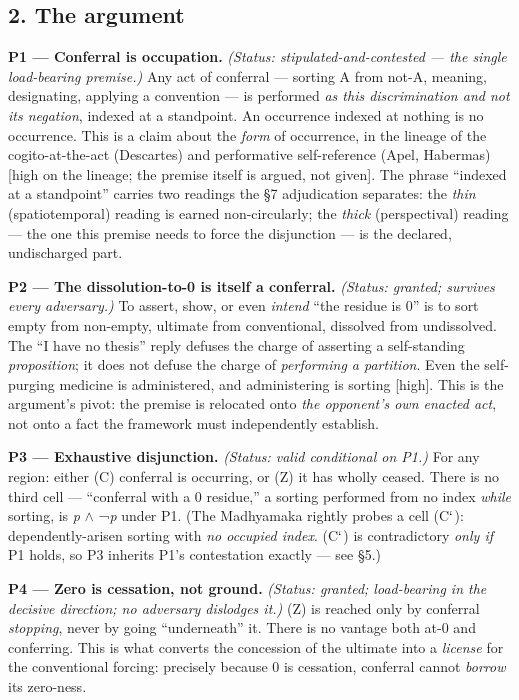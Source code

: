 \documentclass[11pt]{article}
\begin{document}
\subsection*{2. The argument}

\textbf{P1 — Conferral is occupation.} \emph{(Status: stipulated-and-contested — the single load-bearing premise.)} Any act of conferral — sorting A from not-A, meaning, designating, applying a convention — is performed \emph{as this discrimination and not its negation}, indexed at a standpoint. An occurrence indexed at nothing is no occurrence. This is a claim about the \emph{form} of occurrence, in the lineage of the cogito-at-the-act (Descartes) and performative self-reference (Apel, Habermas) [high on the lineage; the premise itself is argued, not given]. The phrase ``indexed at a standpoint'' carries two readings the §7 adjudication separates: the \emph{thin} (spatiotemporal) reading is earned non-circularly; the \emph{thick} (perspectival) reading — the one this premise needs to force the disjunction — is the declared, undischarged part.

\textbf{P2 — The dissolution-to-0 is itself a conferral.} \emph{(Status: granted; survives every adversary.)} To assert, show, or even \emph{intend} ``the residue is 0'' is to sort empty from non-empty, ultimate from conventional, dissolved from undissolved. The ``I have no thesis'' reply defuses the charge of asserting a self-standing \emph{proposition}; it does not defuse the charge of \emph{performing a partition}. Even the self-purging medicine is administered, and administering is sorting [high]. This is the argument's pivot: the premise is relocated onto \emph{the opponent's own enacted act}, not onto a fact the framework must independently establish.

\textbf{P3 — Exhaustive disjunction.} \emph{(Status: valid conditional on P1.)} For any region: either (C) conferral is occurring, or (Z) it has wholly ceased. There is no third cell — ``conferral with a 0 residue,'' a sorting performed from no index \emph{while} sorting, is \emph{p} \ensuremath{\wedge} ¬\emph{p} under P1. (The Madhyamaka rightly probes a cell (C\ensuremath{`}): dependently-arisen sorting with \emph{no occupied index}. (C\ensuremath{`}) is contradictory \emph{only if} P1 holds, so P3 inherits P1's contestation exactly — see §5.)

\textbf{P4 — Zero is cessation, not ground.} \emph{(Status: granted; load-bearing in the decisive direction; no adversary dislodges it.)} (Z) is reached only by conferral \emph{stopping}, never by going ``underneath'' it. There is no vantage both at-0 and conferring. This is what converts the concession of the ultimate into a \emph{license} for the conventional forcing: precisely because 0 is cessation, conferral cannot \emph{borrow} its zero-ness.
\end{document}
